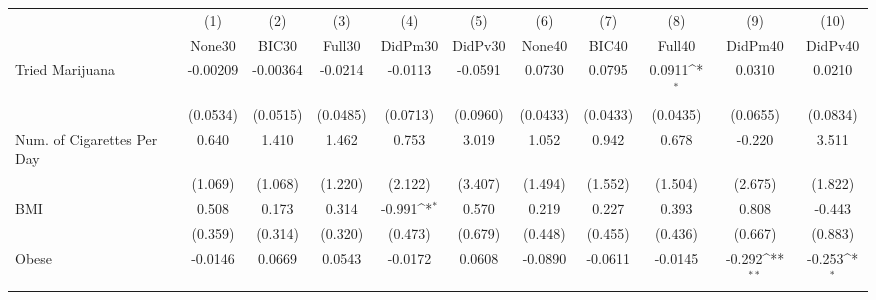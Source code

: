 {
\def\sym#1{\ifmmode^{#1}\else\(^{#1}\)\fi}
\begin{tabular}{l*{10}{c}}
\toprule
            &\multicolumn{1}{c}{(1)}&\multicolumn{1}{c}{(2)}&\multicolumn{1}{c}{(3)}&\multicolumn{1}{c}{(4)}&\multicolumn{1}{c}{(5)}&\multicolumn{1}{c}{(6)}&\multicolumn{1}{c}{(7)}&\multicolumn{1}{c}{(8)}&\multicolumn{1}{c}{(9)}&\multicolumn{1}{c}{(10)}\\
            &\multicolumn{1}{c}{None30}&\multicolumn{1}{c}{BIC30}&\multicolumn{1}{c}{Full30}&\multicolumn{1}{c}{DidPm30}&\multicolumn{1}{c}{DidPv30}&\multicolumn{1}{c}{None40}&\multicolumn{1}{c}{BIC40}&\multicolumn{1}{c}{Full40}&\multicolumn{1}{c}{DidPm40}&\multicolumn{1}{c}{DidPv40}\\
\midrule
Tried Marijuana&    -0.00209         &    -0.00364         &     -0.0214         &     -0.0113         &     -0.0591         &      0.0730         &      0.0795         &      0.0911\sym{*}  &      0.0310         &      0.0210         \\
            &    (0.0534)         &    (0.0515)         &    (0.0485)         &    (0.0713)         &    (0.0960)         &    (0.0433)         &    (0.0433)         &    (0.0435)         &    (0.0655)         &    (0.0834)         \\
\addlinespace
Num. of Cigarettes Per Day&       0.640         &       1.410         &       1.462         &       0.753         &       3.019         &       1.052         &       0.942         &       0.678         &      -0.220         &       3.511         \\
            &     (1.069)         &     (1.068)         &     (1.220)         &     (2.122)         &     (3.407)         &     (1.494)         &     (1.552)         &     (1.504)         &     (2.675)         &     (1.822)         \\
\addlinespace
BMI         &       0.508         &       0.173         &       0.314         &      -0.991\sym{*}  &       0.570         &       0.219         &       0.227         &       0.393         &       0.808         &      -0.443         \\
            &     (0.359)         &     (0.314)         &     (0.320)         &     (0.473)         &     (0.679)         &     (0.448)         &     (0.455)         &     (0.436)         &     (0.667)         &     (0.883)         \\
\addlinespace
Obese       &     -0.0146         &      0.0669         &      0.0543         &     -0.0172         &      0.0608         &     -0.0890         &     -0.0611         &     -0.0145         &      -0.292\sym{**} &      -0.253\sym{*}  \\

\end{tabular}}
